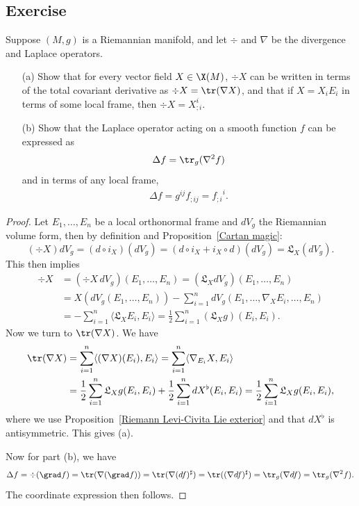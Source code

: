\subsection{Exercise}
\begin{exercise}\label{Riemann div as trace}
Suppose $(M,g)$ is a Riemannian manifold, and let $\div$ and $\nabla$ be the divergence and Laplace operators.
\begin{itemize}
\item[(a)] Show that for every vector field $X\in\X(M)$, $\div X$ can be written in terms of the total covariant derivative as $\div X=\tr(\nabla X)$, and that if 
$X=X_iE_i$ in terms of some local frame, then $\div X=X^i_{;i}$.
\item[(b)] Show that the Laplace operator acting on a smooth function $f$ can be expressed as 
\begin{align}\label{Riemann laplacian trace-1}
\Delta f=\tr_g(\nabla^2 f)
\end{align}
and in terms of any local frame,
\begin{align}\label{Riemann laplacian trace-2}
\Delta f=g^{ij}f_{;ij}={f_{;i}}^i.
\end{align}
\end{itemize}
\end{exercise}
\begin{proof}
Let $E_1,\dots,E_n$ be a local orthonormal frame and $dV_g$ the Riemannian volume form, then by definition and Proposition~\ref{Cartan magic}:
\[(\div X)dV_g=(d\circ i_X)(dV_g)=(d\circ i_X+i_X\circ d)(dV_g)=\mathfrak{L}_X(dV_g).\]
This then implies
\begin{align*}
\div X&=(\div X\,dV_g)(E_1,\dots,E_n)=(\mathfrak{L}_XdV_g)(E_1,\dots,E_n)\\
&=X(dV_g(E_1,\dots,E_n))-\sum_{i=1}^{n}dV_g(E_1,\dots,\nabla_XE_i,\dots,E_n)\\
&=-\sum_{i=1}^{n}\langle\mathfrak{L}_XE_i,E_i\rangle=\frac{1}{2}\sum_{i=1}^{n}(\mathfrak{L}_Xg)(E_i,E_i).
\end{align*}
Now we turn to $\tr(\nabla X)$. We have
\begin{align*}
\tr(\nabla X)&=\sum_{i=1}^{n}\langle(\nabla X)(E_i),E_i\rangle=\sum_{i=1}^{n}\langle\nabla_{E_i}X,E_i\rangle\\
&=\frac{1}{2}\sum_{i=1}^{n}\mathfrak{L}_Xg(E_i,E_i)+\frac{1}{2}\sum_{i=1}^{n}dX^{\flat}(E_i,E_i)=\frac{1}{2}\sum_{i=1}^{n}\mathfrak{L}_Xg(E_i,E_i),
\end{align*}
where we use Proposition~\ref{Riemann Levi-Civita Lie exterior} and that $dX^{\flat}$ is antisymmetric. This gives (a).\par
Now for part (b), we have 
\[\Delta f=\div(\grad f)=\tr(\nabla(\grad f))=\tr(\nabla (df)^{\sharp})=\tr((\nabla df)^{\sharp})=\tr_g(\nabla df)=\tr_g(\nabla^2 f).\]
The coordinate expression then follows.
\end{proof}

